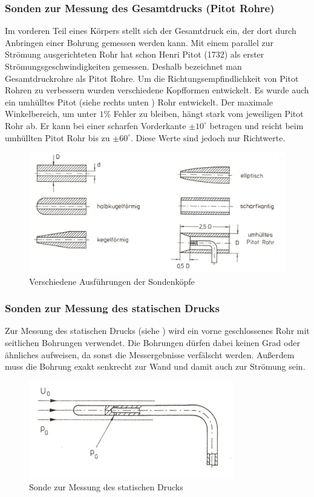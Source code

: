 \subsubsection{Sonden zur Messung des Gesamtdrucks (Pitot Rohre)}
Im vorderen Teil eines Körpers stellt sich der Gesamtdruck ein, der dort durch Anbringen einer Bohrung gemessen werden kann. Mit einem parallel zur Strömung ausgerichteten Rohr hat schon Henri Pitot (1732) als erster Strömungsgeschwindigkeiten gemessen. Deshalb bezeichnet man Gesamtdruckrohre als Pitot Rohre. Um die Richtungsempfindlichkeit von Pitot Rohren zu verbessern wurden verschiedene Kopfformen entwickelt. Es wurde auch ein umhülltes Pitot (siehe rechts unten ) Rohr entwickelt. Der maximale Winkelbereich, um unter $ 1 \% $ Fehler zu bleiben, hängt stark vom jeweiligen Pitot Rohr ab. Er kann bei einer scharfen Vorderkante $ \pm 10^{\circ} $ betragen und reicht beim umhüllten Pitot Rohr bis zu $ \pm 60^{\circ} $. Diese Werte sind jedoch nur Richtwerte.
\begin{figure}
	\centering
	\includegraphics[width=\textwidth]{images/sonden.jpg}
	\caption{Verschiedene Ausführungen der Sondenköpfe}
	\label{sonden}
\end{figure}

\subsubsection{Sonden zur Messung des statischen Drucks}
Zur Messung des statischen Drucks (siehe ) wird ein vorne geschlossenes Rohr mit seitlichen Bohrungen verwendet. Die Bohrungen dürfen dabei keinen Grad oder ähnliches aufweisen, da sonst die Messergebnisse verfälscht werden. Außerdem muss die Bohrung exakt senkrecht zur Wand und damit auch zur Strömung sein.
\begin{figure}
	\centering
	\includegraphics[width=0.8\textwidth]{images/statisch}
	\caption{Sonde zur Messung des statischen Drucks}
	\label{statisch}
\end{figure}

